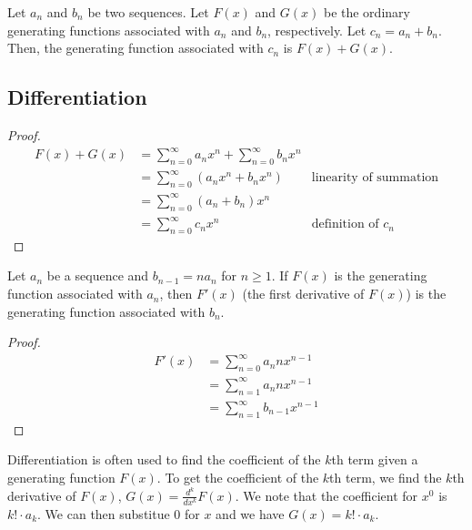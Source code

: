 \begin{lemma}
    Let $a_n$ and $b_n$ be two sequences. Let $F(x)$ and $G(x)$ be the ordinary generating functions associated with $a_n$ and $b_n$, respectively. Let $c_n = a_n + b_n$. Then, the generating function associated with $c_n$ is $F(x) + G(x)$.
\end{lemma}

\subsection{Differentiation}

\begin{proof}
    $$
    \begin{aligned}
        F(x) + G(x) &= \sum_{n=0}^\infty a_n x^n + \sum_{n=0}^\infty b_n x^n \\
        &= \sum_{n=0}^\infty (a_n x^n + b_n x^n) & \text{linearity of summation} \\
        &= \sum_{n=0}^\infty (a_n + b_n) x^n \\
        &= \sum_{n=0}^\infty c_n x^n & \text{definition of $c_n$}
    \end{aligned}
    $$
\end{proof}

\begin{theorem}
    Let $a_n$ be a sequence and $b_{n-1} = na_n$ for $n \geq 1$. If $F(x)$ is the generating function associated with $a_n$, then $F'(x)$ (the first derivative of $F(x)$) is the generating function associated with $b_n$.
\end{theorem}

\begin{proof}
    $$
    \begin{aligned}
        F'(x) &= \sum_{n=0}^\infty a_n n x^{n-1} \\
        &= \sum_{n=1}^\infty a_n n x^{n-1} \\
        &= \sum_{n=1}^\infty b_{n-1} x^{n-1}
    \end{aligned}
    $$
\end{proof}

Differentiation is often used to find the coefficient of the $k$th term given a generating function $F(x)$. To get the coefficient of the $k$th term, we find the $k$th derivative of $F(x)$, $G(x) = \frac{d^k}{dx^k} F(x)$. We note that the coefficient for $x^0$ is $k! \cdot a_k$. We can then substitue $0$ for $x$ and we have $G(x) = k! \cdot a_k$.

